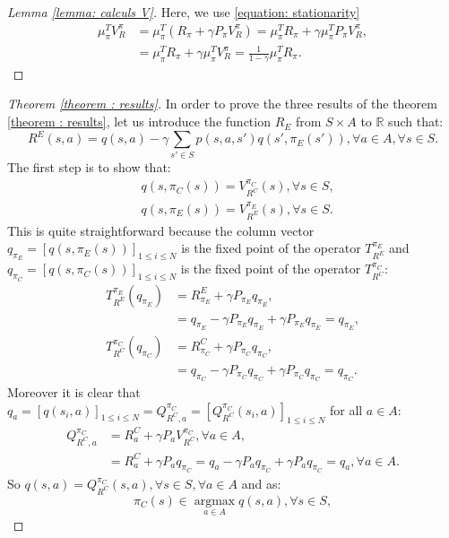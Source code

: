 \documentclass{article} %
\newcommand{\argmax}{\operatorname*{argmax}}
\newcommand{\0}{\mathbf{0}}
\newcommand{\1}{\mathbf{1}}
\begin{document}
\begin{proof}[Lemma \ref{lemma: calculs V}]
Here, we use \eqref{equation: stationarity}
\begin{align}
\mu_\pi^TV^\pi_R&=\mu_\pi^T(R_\pi+\gamma P_\pi V^\pi_R)=\mu_\pi^TR_\pi+ \gamma\mu_\pi^TP_\pi V^\pi_R,
\\
&=\mu_\pi^TR_\pi+ \gamma\mu_\pi^TV^\pi_R=\frac{1}{1-\gamma}\mu_\pi^TR_\pi.
\end{align}
\end{proof}
\begin{proof}[Theorem \ref{theorem : results}]
In order to prove the three results of the theorem \ref{theorem : results}, let us introduce the function $R_E$ from $S\times A$ to $\mathbb{R}$ such that:
\begin{equation}
R^E(s,a)=q(s,a)-\gamma\sum_{s'\in S}p(s,a,s')q(s',\pi_E(s')), \forall a \in A, \forall s\in S.
\end{equation}
The first step is to show that:
\begin{align}
&q(s,\pi_C(s))=V^{\pi_C}_{R^C}(s), \forall s\in S,
\\
&q(s,\pi_E(s))=V^{\pi_E}_{R^E}(s), \forall s\in S.
\end{align}
This is quite straightforward because the column vector $q_{\pi_E}=[q(s,\pi_E(s))]_{1\leq i\leq N}$ is the fixed point of the operator $T^{\pi_E}_{R^E}$ and  $q_{\pi_C}=[q(s,\pi_C(s))]_{1\leq i\leq N}$ is the fixed point of the operator $T^{\pi_C}_{R^C}$:
\begin{align}
T^{\pi_E}_{R^E}(q_{\pi_E})&=R^E_{\pi_E}+\gamma P_{\pi_E}q_{\pi_E},
\\
&=q_{\pi_E}-\gamma P_{\pi_E}q_{\pi_E}+\gamma P_{\pi_E}q_{\pi_E}=q_{\pi_E},
\\
T^{\pi_C}_{R^C}(q_{\pi_C})&=R^C_{\pi_C}+\gamma P_{\pi_C}q_{\pi_C},
\\
&=q_{\pi_C}-\gamma P_{\pi_C}q_{\pi_C}+\gamma P_{\pi_C}q_{\pi_C}=q_{\pi_C}.
\end{align}
Moreover it is clear that $q_a=[q(s_i,a)]_{1\leq i\leq N}=Q^{\pi_C}_{R^C,a}=[Q^{\pi_C}_{R^C}(s_i,a)]_{1\leq i\leq N}$ for all $a \in A$:
\begin{align}
Q^{\pi_C}_{R^C,a}&=R^C_a+\gamma P_a V^{\pi_C}_{R^C}, \forall a\in A,
\\
&=R^C_a+\gamma P_a q_{\pi_C}=q_a-\gamma P_a q_{\pi_C} + \gamma P_a q_{\pi_C}=q_a, \forall a\in A.
\end{align}
So $q(s,a)=Q^{\pi_C}_{R^C}(s,a),\forall s\in S,\forall a\in A$ and as:
\begin{equation}
\pi_C(s)\in\argmax_{a\in A}q(s,a), \forall s\in S,

\end{equation}
\end{proof}
\end{document}
